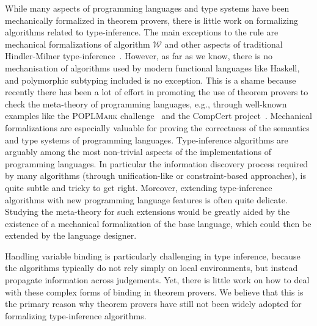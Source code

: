 While many aspects of programming languages and type systems
have been mechanically formalized in theorem provers, there is little work on
formalizing algorithms related to type-inference. The main exceptions to the rule
are mechanical formalizations of algorithm $\mathcal{W}$ and other aspects
of traditional Hindler-Milner 
type-inference~\cite{naraschewski1999type,dubois2000proving,
dubois1999certification,urban2008nominal,garrigue2015certified}.
However, as far as we know, there is no mechanisation of algorithms 
used by modern functional languages like Haskell, and
polymorphic subtyping included is no exception.  
This is a shame because recently there has been a lot of effort
in promoting the use of theorem provers to check the meta-theory 
of programming languages, e.g., through well-known examples like the \textsc{POPLMark} challenge~\cite{aydemir2005mechanized} and the CompCert project~\cite{leroy2012compcert}.
Mechanical formalizations are especially valuable for proving the
correctness of the semantics and type systems 
of programming languages. Type-inference algorithms are arguably among
the most non-trivial aspects of the implementations of programming
languages. In particular the information discovery process required by 
many algorithms (through unification-like or constraint-based
approaches), is quite subtle and tricky to get right. Moreover,
extending type-inference algorithms with new programming language features is often quite 
delicate. Studying the meta-theory for such extensions would be
greatly aided by the existence of a mechanical
formalization of the base language, which could then be extended by
the language designer.

Handling variable binding is particularly challenging in type inference,
because the algorithms typically do not rely simply on local environments, but
instead propagate information across judgements. Yet, there is little work on
how to deal with these complex forms of binding in theorem provers. We believe
that this is the primary reason why theorem provers have still not been widely
adopted for formalizing type-inference algorithms.

